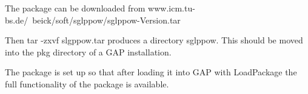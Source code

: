 

The package can be downloaded from
    www.icm.tu-bs.de/~beick/soft/sglppow/sglppow-Version.tar

Then tar -zxvf slgppow.tar produces a directory sglppow. This should be
moved into the pkg directory of a GAP installation.

The package is set up so that after loading it into GAP with LoadPackage 
the full functionality of the package is available.

